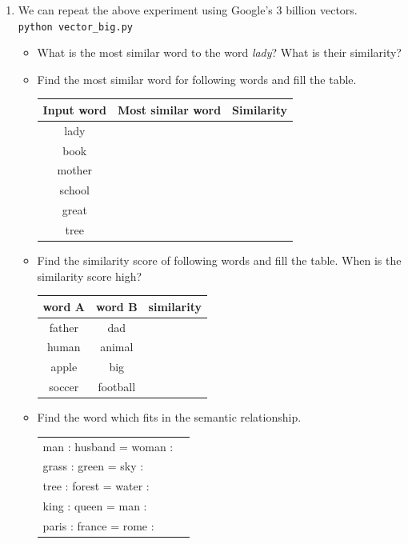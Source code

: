 \documentclass[12pt,fleqn]{article}
\begin{document}
\begin{enumerate}
\item We can repeat the above experiment using Google's 3 billion vectors. \\ 

\texttt{python vector\_big.py} \\ 

\begin{itemize} 
 \item What is the most similar word to the word \textit{lady}? What is their similarity? 
 \item Find the most similar word for following words and fill the table. 
 \begin{table}[htb!] 
  \begin{center} 
     \begin{tabular}{c|c|c}
      Input word & Most similar word & Similarity \\  \hline 
      lady & & \\ 
      book & & \\ 
      mother & & \\ 
      school & & \\ 
      great & & \\ 
      tree & & \\ 
     \end{tabular}
  \end{center}
\end{table}
\item Find the similarity score of following words and fill the table. When is the similarity score high? 
\begin{table}[htb!] 
   \begin{center} 
         \begin{tabular}{c|c|c}
          word A & word B & similarity \\  \hline 
          father & dad &  \\ 
          human & animal &  \\ 
          apple & big & \\ 
          soccer & football & \\ 
         \end{tabular}
   \end{center}
\end{table}

\item Find the word which fits in the semantic relationship.

\begin{table}[htb!] 
   \begin{center} 
         \begin{tabular}{lc}
man : husband = woman :&  \\ 
grass : green = sky : & \\ 
tree : forest = water : & \\ 
king : queen = man : & \\ 
paris : france = rome : & \\
         \end{tabular}
   \end{center}
\end{table}
\end{itemize}


\end{enumerate}
\end{document}
